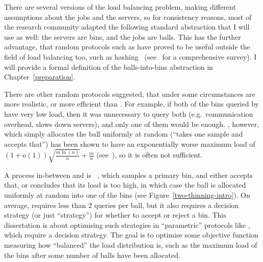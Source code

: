 There are several versions of the load balancing problem, making different assumptions about the jobs and the servers, so for consistency reasons, most of the research community adapted the following standard abstraction that I will use as well: the servers are bins, and the jobs are balls. This has the further advantage, that random protocols such as \TwoChoice have proved to be useful outside the field of load balancing too, such as hashing~\cite{azar1999twochoice} (see~\cite{wieder2017ballsintobinslandscape} for a comprehensive survey). I will provide a formal definition of the balls-into-bins abstraction in Chapter~\ref{preparation}.

There are other random protocols suggested, that under some circumstances are more realistic, or more efficient than \TwoChoice. For example, if both of the bins queried by \TwoChoice have very low load, then it was unnecessary to query both (e.g.\ communication overhead, slows down servers), and only one of them would be enough. \OneChoice, however, which simply allocates the ball uniformly at random (``takes one sample and accepts that'') has been shown to have an exponentially worse maximum load of $(1+o(1))\sqrt{\frac{m\ln(n)}{n}}+\frac{m}{n}$ (see~\cite{mitzenmacher2005probabilitybook}), so it is often not sufficient. 


A process in-between \OneChoice and \TwoChoice is \TwoThinning~\cite{feldheim2021thinning}, which samples a primary bin, and either accepts that, or concludes that its load is too high, in which case the ball is allocated uniformly at random into one of the bins (see Figure~\ref{two-thinning-intro}). On average, \TwoThinning requires less than $2$ queries per ball, but it also requires a decision strategy (or just ``strategy'') for whether to accept or reject a bin. This dissertation is about optimising such strategies in ``parametric'' protocols like \TwoThinning, which require a decision strategy. The goal is to optimise some objective function measuring how ``balanced'' the load distribution is, such as the maximum load of the bins after some number of balls have been allocated.



